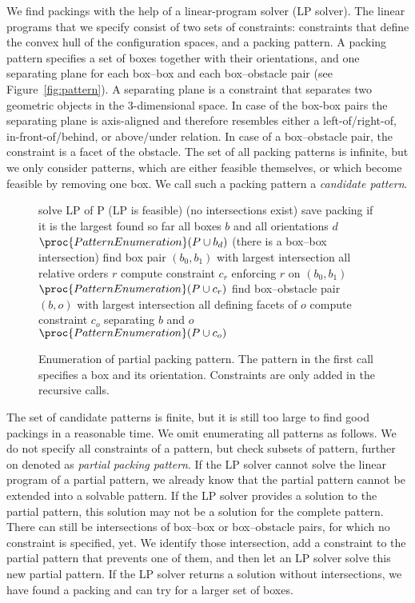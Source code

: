\documentclass{article}
\begin{document}
We find packings with the help of a linear-program solver (LP solver).
The linear programs that we specify consist of two sets of
constraints: constraints that define the convex hull of the
configuration spaces, and a packing pattern. A packing pattern
specifies a set of boxes together with their orientations, and one
separating plane for each box--box and each box--obstacle pair (see
Figure~\ref{fig:pattern}). A separating plane is a constraint that
separates two geometric objects in the 3-dimensional space. In case of
the box-box pairs the separating plane is axis-aligned and therefore
resembles either a left-of/right-of, in-front-of/behind, or
above/under relation. In case of a box--obstacle pair, the constraint
is a facet of the obstacle. The set of all packing patterns is
infinite, but we only consider patterns, which are either feasible
themselves, or which become feasible by removing one box. We call such
a packing pattern a \emph{candidate pattern}.

\begin{figure}
\begin{codebox}
\li solve LP of P
\li \If (LP is feasible) \Indentmore
\li \If (no intersections exist) \Indentmore
\li save packing if it is the largest found so far 
\li \For all boxes $b$ and all orientations $d$ \Indentmore
\li $\proc{PatternEnumeration}(P\cup b_d)$ \End
\li \Else \If(there is a box--box intersection)
\li  find box pair $(b_0, b_1)$ with largest intersection
\li \For all relative orders $r$ \Indentmore
\li compute constraint $c_r$ enforcing $r$ on $(b_0, b_1)$
\li $\proc{PatternEnumeration}(P\cup c_r)$ \End
\li \Else find box--obstacle pair $(b, o)$ with largest intersection
\li \For all defining facets of $o$ \Indentmore
\li compute constraint $c_o$ separating $b$ and $o$
\li $\proc{PatternEnumeration}(P\cup c_o)$ \End \End \End
\end{codebox}
\caption{\label{fig:patternEnumeration} Enumeration of partial packing
  pattern. The pattern in the first call specifies a box and its
  orientation. Constraints are only added in the recursive calls.}
\end{figure}

The set of candidate patterns is finite, but it is still too large to
find good packings in a reasonable time. We omit enumerating all
patterns as follows. We do not specify all constraints of a pattern,
but check subsets of pattern, further on denoted as \emph{partial
packing pattern}. If the LP solver cannot solve the linear program of
a partial pattern, we already know that the partial pattern cannot be
extended into a solvable pattern. If the LP solver provides a solution
to the partial pattern, this solution may not be a solution for the
complete pattern. There can still be intersections of box--box or
box--obstacle pairs, for which no constraint is specified, yet. We
identify those intersection, add a constraint to the partial pattern
that prevents one of them, and then let an LP solver solve this new
partial pattern. If the LP solver returns a solution without
intersections, we have found a packing and can try for a larger set of
boxes.
\end{document}
